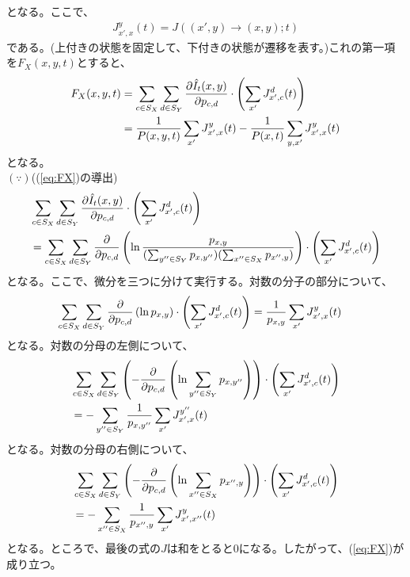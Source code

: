 \documentclass[a4paper,11pt]{jsarticle}
\numberwithin{equation}{section}
\begin{document}
となる。ここで、
\begin{align}
    J_{x',x}^y(t) = J((x',y) \to (x,y); t) 
\end{align}
である。(上付きの状態を固定して、下付きの状態が遷移を表す。)これの第一項を$F_X(x,y,t)$とすると、
\begin{align}
    F_X(x,y,t) &= \sum_{c \in S_X} \sum_{d \in S_Y} \pdv{\hat{I}_t(x,y)}{p_{c,d}} \cdot \left( \sum_{x'} J_{x' ,c}^d(t) \right) \\
    &= \frac{1}{P(x,y,t)} \sum_{x'} J_{x',x}^y(t) - \frac{1}{P(x,t)} \sum_{y,x'} J_{x',x}^y(t) \label{eq:FX}
\end{align}
となる。\\
$(\because)$((\ref{eq:FX})の導出)\\
\begin{align}
    &\sum_{c\in S_X} \sum_{d \in S_Y} \pdv{\hat{I}_t(x,y)}{p_{c,d}} \cdot \left( \sum_{x'} J_{x' ,c}^d(t) \right)\\
    &= \sum_{c\in S_X} \sum_{d \in S_Y} \pdv{p_{c,d}}\left( \ln \frac{p_{x,y}}{(\sum_{y'' \in S_Y} p_{x,y''})(\sum_{x'' \in S_X} p_{x'',y})} \right) \cdot \left( \sum_{x'} J_{x' ,c}^d(t) \right)
\end{align}
となる。ここで、微分を三つに分けて実行する。対数の分子の部分について、
\begin{align}
    \sum_{c\in S_X} \sum_{d \in S_Y} \pdv{p_{c,d}}\left( \ln p_{x,y} \right) \cdot \left( \sum_{x'} J_{x' ,c}^d(t) \right) &= \frac{1}{p_{x,y}} \sum_{x'} J_{x' ,x}^y(t)
\end{align}
となる。対数の分母の左側について、
\begin{align}
    &\sum_{c\in S_X} \sum_{d \in S_Y} \left(-\pdv{p_{c,d}}\left( \ln \sum_{y'' \in S_Y} p_{x,y''} \right) \right) \cdot \left( \sum_{x'} J_{x' ,c}^d(t) \right) \\
    &= -\sum_{y'' \in S_Y} \frac{1}{p_{x,y''}} \sum_{x'} J_{x' ,x}^{y''}(t)
\end{align}
となる。対数の分母の右側について、
\begin{align}
    &\sum_{c\in S_X} \sum_{d \in S_Y} \left(-\pdv{p_{c,d}}\left( \ln \sum_{x'' \in S_X} p_{x'',y} \right) \right) \cdot \left( \sum_{x'} J_{x' ,c}^d(t) \right) \\
    &= -\sum_{x'' \in S_X} \frac{1}{p_{x'',y}} \sum_{x'} J_{x' ,x''}^{y}(t)
\end{align}
となる。ところで、最後の式の$J$は和をとると$0$になる。したがって、(\ref{eq:FX})が成り立つ。\hfill\qedsymbol\\
\end{document}
